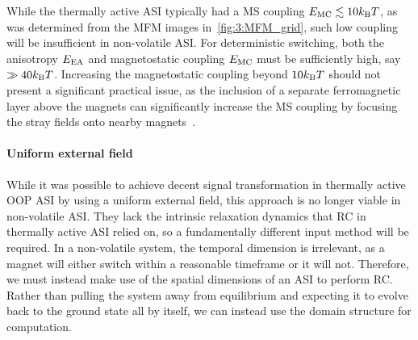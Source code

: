 While the thermally active ASI typically had a MS coupling $\EMC \lesssim 10\kBT$, as was determined from the MFM images in~\cref{fig:3:MFM_grid}, such low coupling will be insufficient in non-volatile ASI.
For deterministic switching, both the anisotropy $E_\mathrm{EA}$ and magnetostatic coupling $E_\mathrm{MC}$ must be sufficiently high, say $\gg 40 \kBT$.
Increasing the magnetostatic coupling beyond $10\kBT$ should not present a significant practical issue, as the inclusion of a separate ferromagnetic layer above the magnets can significantly increase the MS coupling by focusing the stray fields onto nearby magnets~\cite[Supp. 10]{KUR-24}.

\paragraph{Uniform external field}
While it was possible to achieve decent signal transformation in thermally active OOP ASI by using a uniform external field, this approach is no longer viable in non-volatile ASI.
They lack the intrinsic relaxation dynamics that RC in thermally active ASI relied on, so a fundamentally different input method will be required.
In a non-volatile system, the temporal dimension is irrelevant, as a magnet will either switch within a reasonable timeframe or it will not.
Therefore, we must instead make use of the spatial dimensions of an ASI to perform RC.
Rather than pulling the system away from equilibrium and expecting it to evolve back to the ground state all by itself, we can instead use the domain structure for computation.

